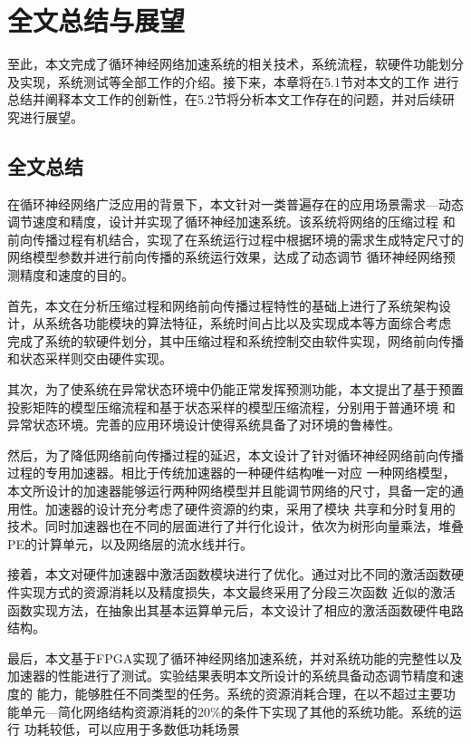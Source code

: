 \chapter{全文总结与展望}
至此，本文完成了循环神经网络加速系统的相关技术，系统流程，软硬件功能划分及实现，系统测试等全部工作的介绍。接下来，本章将在5.1节对本文的工作
进行总结并阐释本文工作的创新性，在5.2节将分析本文工作存在的问题，并对后续研究进行展望。
\section{全文总结}
在循环神经网络广泛应用的背景下，本文针对一类普遍存在的应用场景需求---动态调节速度和精度，设计并实现了循环神经加速系统。该系统将网络的压缩过程
和前向传播过程有机结合，实现了在系统运行过程中根据环境的需求生成特定尺寸的网络模型参数并进行前向传播的系统运行效果，达成了动态调节
循环神经网络预测精度和速度的目的。

首先，本文在分析压缩过程和网络前向传播过程特性的基础上进行了系统架构设计，从系统各功能模块的算法特征，系统时间占比以及实现成本等方面综合考虑
完成了系统的软硬件划分，其中压缩过程和系统控制交由软件实现，网络前向传播和状态采样则交由硬件实现。

其次，为了使系统在异常状态环境中仍能正常发挥预测功能，本文提出了基于预置投影矩阵的模型压缩流程和基于状态采样的模型压缩流程，分别用于普通环境
和异常状态环境。完善的应用环境设计使得系统具备了对环境的鲁棒性。

然后，为了降低网络前向传播过程的延迟，本文设计了针对循环神经网络前向传播过程的专用加速器。相比于传统加速器的一种硬件结构唯一对应
一种网络模型，本文所设计的加速器能够运行两种网络模型并且能调节网络的尺寸，具备一定的通用性。加速器的设计充分考虑了硬件资源的约束，采用了模块
共享和分时复用的技术。同时加速器也在不同的层面进行了并行化设计，依次为树形向量乘法，堆叠PE的计算单元，以及网络层的流水线并行。

接着，本文对硬件加速器中激活函数模块进行了优化。通过对比不同的激活函数硬件实现方式的资源消耗以及精度损失，本文最终采用了分段三次函数
近似的激活函数实现方法，在抽象出其基本运算单元后，本文设计了相应的激活函数硬件电路结构。

最后，本文基于FPGA实现了循环神经网络加速系统，并对系统功能的完整性以及加速器的性能进行了测试。实验结果表明本文所设计的系统具备动态调节精度和速度的
能力，能够胜任不同类型的任务。系统的资源消耗合理，在以不超过主要功能单元---简化网络结构资源消耗的20\%的条件下实现了其他的系统功能。系统的运行
功耗较低，可以应用于多数低功耗场景

